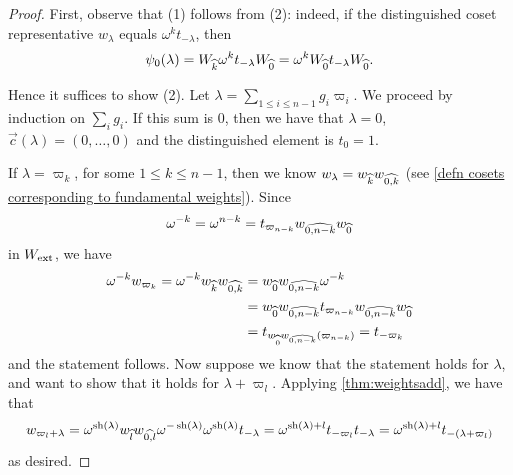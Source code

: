 \begin{proof}
    First, observe that (1) follows from (2): indeed, if the distinguished coset representative $w_\lambda$ equals $\omega^{k}t_{-\lambda}$, then 
    \begin{equation}\psi_0(\lambda)=W_{\widehat{k}}\omega^{k}t_{-\lambda}W_{\widehat{0}}=\omega^{k}W_{\widehat{0}}t_{-\lambda}W_{\widehat{0}}.\end{equation}
    
    Hence it suffices to show (2). Let $\lambda = \sum_{1 \leq i \leq n-1}g_i\varpi_i$.
    We proceed by induction on $\sum_{i}g_i$. If this sum is $0$, then we have that $\lambda=0$, $\vec{c}(\lambda)=(0,\ldots, 0)$ and the distinguished element is $t_0=1$.
    
    If $\lambda= \varpi_k$, for some $1\leq k  \leq n-1$, then we know $w_{\lambda}=w_{\widehat{k}}w_{\widehat{0,k}}$ (see \cref{defn cosets corresponding to fundamental weights}).
    Since \begin{equation} \omega^{-k}=\omega^{n-k}=t_{\varpi_{n-k}}w_{\widehat{0,n-k}}w_{\widehat{0}}\end{equation} in $W_{\operatorname{ext}}$, we have
    \begin{align}
    \omega^{-k}w_{\varpi_k}=\omega^{-k}w_{\widehat{k}}w_{\widehat{0,k}}&=w_{\widehat{0}}w_{\widehat{0,n-k}}\omega^{-k}\\ \nonumber
    &=w_{\widehat{0}}w_{\widehat{0,n-k}}t_{\varpi_{n-k}}w_{\widehat{0,n-k}}w_{\widehat{0}}\\ \nonumber 
    &=t_{w_{\widehat{0}}w_{\widehat{0,n-k}}(\varpi_{n-k})}=t_{-\varpi_k}
    \end{align}
    and the statement follows.
    Now suppose we know that the statement holds for $\lambda$, and want to show that it holds for $\lambda+\varpi_l$.
    Applying \cref{thm:weightsadd}, we have that 
    $$w_{\varpi_l+\lambda}=\omega^{\operatorname{sh}(\lambda)}w_{\widehat{l}}w_{\widehat{0,l}}\omega^{-\operatorname{sh}(\lambda)}\omega^{\operatorname{sh}(\lambda)}t_{-\lambda}=\omega^{\operatorname{sh}(\lambda)+l}t_{-\varpi_l}t_{-\lambda}=\omega^{\operatorname{sh}(\lambda)+l}t_{-(\lambda+\varpi_l)}$$
    as desired.
\end{proof}


